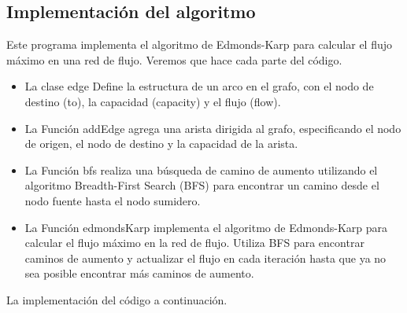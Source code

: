\documentclass[a4paper]{article}
\begin{document}
\subsection{Implementación del algoritmo}
Este programa implementa el algoritmo de Edmonds-Karp para calcular el flujo máximo en una red de flujo. Veremos que hace cada parte del código.
\begin{itemize}
    \item La clase edge Define la estructura de un arco en el grafo, con el nodo de destino (to), la capacidad (capacity) y el flujo (flow).
    \item La Función addEdge agrega una arista dirigida al grafo, especificando el nodo de origen, el nodo de destino y la capacidad de la arista.
    \item La Función bfs realiza una búsqueda de camino de aumento utilizando el algoritmo Breadth-First Search (BFS) para encontrar un camino desde el nodo fuente hasta el nodo sumidero.
    \item La Función edmondsKarp implementa el algoritmo de Edmonds-Karp para calcular el flujo máximo en la red de flujo. Utiliza BFS para encontrar caminos de aumento y actualizar el flujo en cada iteración hasta que ya no sea posible encontrar más caminos de aumento.
\end{itemize}
La implementación del código a continuación.
\end{document}
